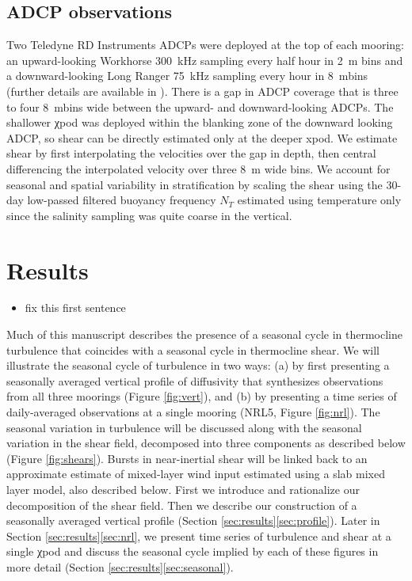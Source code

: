 \documentclass[twocol]{ametsoc}
\begin{document}
\subsection{ADCP observations}
\label{sec:org64141d8}

Two Teledyne RD Instruments ADCPs were deployed at the top of each mooring: an upward-looking Workhorse \SI{300}{kHz} sampling every half hour in \SI{2}{m} bins and a downward-looking Long Ranger \SI{75}{kHz} sampling every hour in \SI{8}{m}{bins} (further details are available in \citealp{Wijesekera2016a}).
There is a gap in ADCP coverage that is three to four \SI{8}{m}{bins} wide between the upward- and downward-looking ADCPs.
The shallower χpod was deployed within the blanking zone of the downward looking ADCP, so shear can be directly estimated only at the deeper xpod.
We estimate shear by first interpolating the velocities over the gap in depth, then central differencing the interpolated velocity over three \SI{8}{m} wide bins.
We account for seasonal and spatial variability in stratification by scaling the shear using the 30-day low-passed filtered buoyancy frequency \(N_T\) estimated using temperature only since the salinity sampling was quite coarse in the vertical.


\section{Results}
\label{sec:org6d742af}
\label{sec:results}

\begin{itemize}
\item fix this first sentence
\end{itemize}
Much of this manuscript describes the presence of a seasonal cycle in thermocline turbulence that coincides with a seasonal cycle in thermocline shear.
We will illustrate the seasonal cycle of turbulence in two ways:
 (a) by first presenting a seasonally averaged vertical profile of diffusivity that synthesizes observations from all three moorings (Figure \ref{fig:vert}), and
 (b) by presenting a time series of daily-averaged observations at a single mooring (NRL5, Figure \ref{fig:nrl}).
The seasonal variation in turbulence will be discussed along with the seasonal variation in the shear field, decomposed into three components as described below (Figure \ref{fig:shears}).
Bursts in near-inertial shear will be linked back to an approximate estimate of mixed-layer wind input estimated using a slab mixed layer model, also described below.
First we introduce and rationalize our decomposition of the shear field.
Then we describe our construction of a seasonally averaged vertical profile (Section \ref{sec:results}\ref{sec:profile}).
Later in Section \ref{sec:results}\ref{sec:nrl}, we present time series of turbulence and shear at a single χpod and discuss the seasonal cycle implied by each of these figures in more detail (Section \ref{sec:results}\ref{sec:seasonal}).
\end{document}
